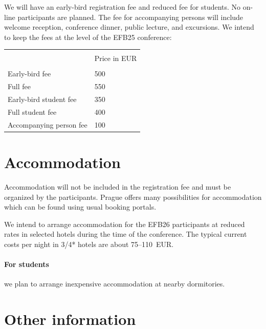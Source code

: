 \documentclass[12pt]{extarticle}
\begin{document}
We will have an early-bird registration fee and reduced fee for
students. No on-line participants are planned. The fee for
accompanying persons will include welcome reception, conference
dinner, public lecture, and excursions. We intend to keep the fees at
the level of the EFB25 conference:
\begin{table}[h]
  \centering
  \begin{tabular}{ll}
    \hline \\[-1mm]
    &   Price in EUR  \\[1mm]
    \hline \\[-1mm]
    Early-bird fee & 500  \\[1mm]
    Full fee &  550 \\[1mm]
    Early-bird student fee & 350  \\[1mm]
    Full student fee &  400 \\[1mm]
    Accompanying person fee & 100  \\[1mm]
    \hline
  \end{tabular}
\end{table}


%

\section*{Accommodation}
\noindent
Accommodation will not be included in the registration fee and must be
organized by the participants. Prague offers many possibilities for
accommodation which can be found using usual booking portals.

We intend to arrange accommodation for the EFB26 participants at
reduced rates in selected hotels during the time of the conference.
The typical current costs per night in 3/4* hotels are about
75--110~EUR.

\paragraph{For students} we plan to arrange inexpensive accommodation
at nearby dormitories.

\section*{Other information}
\end{document}
